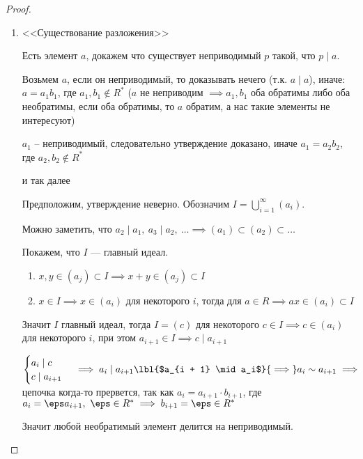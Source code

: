 \begin{proof}

    \begin{enumerate}
        \item <<Существование разложения>>
        
        Есть элемент $a$, докажем что существует неприводимый $p$ такой, что $p \mid a$.

        Возьмем $a$, если он неприводимый, то доказывать нечего (т.к. $a \mid a$), иначе: $a = a_1 b_1$, где $a_1, b_1 \notin R^*$ ($a$ не неприводим $\implies a_1, b_1$ оба обратимы либо оба необратимы, если оба обратимы, то $a$ обратим, а нас такие элементы не интересуют) 
    
        $a_1$ -- неприводимый, следовательно утверждение доказано, иначе $a_1 = a_2 b_2$, где $a_2, b_2 \notin R^*$
    
        и так далее
    
        Предположим, утверждение неверно. Обозначим $I = \bigcup\limits_{i = 1}^{\infty} (a_i)$. 
    
        Можно заметить, что  $a_2 \mid a_1,~ a_3 \mid a_2,~ \ldots \implies (a_1) \subset (a_2) \subset \ldots$
    
        Покажем, что $I$ --- главный идеал. 
        \begin{enumerate}
            \item $x, y \in (a_j) \subset I \implies x+y \in (a_j) \subset I$
    
            \item $x \in I \implies x \in (a_i)$ для некоторого $i$, тогда для $a \in R \implies ax \in (a_i) \subset I$
        \end{enumerate} 
    
        Значит $I$ главный идеал, тогда $I = (c)$ для некоторого $c \in I \implies c \in (a_i)$ для некоторого $i$, при этом $a_{i+1} \in I \implies c \mid a_{i+1}$
    
        $\begin{cases}
            a_i \mid c\\
            c \mid a_{i + 1}
        \end{cases} \implies a_i \mid a_{i+1} \lbl{$a_{i + 1} \mid a_i$}{\implies} a_i \sim a_{i + 1} \implies$ цепочка когда-то прервется, так как $a_i = a_{i + 1} \cdot b_{i + 1}$, где $a_i = \eps a_{i + 1},~ \eps \in R^* \implies b_{i + 1} = \eps \in R^*$ 
    
        Значит любой необратимый элемент делится на неприводимый.


\end{enumerate}
\end{proof}
